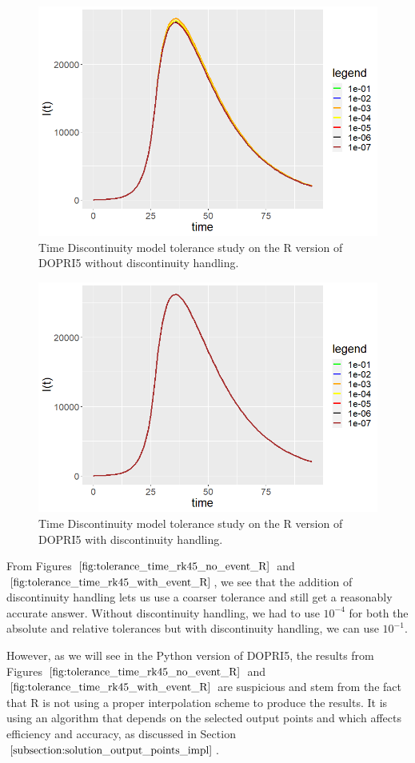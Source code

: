 \begin{figure}[H]
\centering
\includegraphics[width=0.7\linewidth]{./figures/tolerance_time_rk45_no_event_R}
\caption{Time Discontinuity model tolerance study on the R version of DOPRI5 without discontinuity handling.}
\label{fig:tolerance_time_rk45_no_event_R}
\end{figure}

\begin{figure}[H]
\centering
\includegraphics[width=0.7\linewidth]{./figures/tolerance_time_rk45_with_event_R}
\caption{Time Discontinuity model tolerance study on the R version of DOPRI5 with discontinuity handling.}
\label{fig:tolerance_time_rk45_with_event_R}
\end{figure}

From Figures $\ref{fig:tolerance_time_rk45_no_event_R}$ and $\ref{fig:tolerance_time_rk45_with_event_R}$, we see that the addition of discontinuity handling lets us use a coarser tolerance and still get a reasonably accurate answer. Without discontinuity handling, we had to use $10^{-4}$ for both the absolute and relative tolerances but with discontinuity handling, we can use $10^{-1}$. 

However, as we will see in the Python version of DOPRI5, the results from Figures $\ref{fig:tolerance_time_rk45_no_event_R}$ and $\ref{fig:tolerance_time_rk45_with_event_R}$ are suspicious and stem from the fact that R is not using a proper interpolation scheme to produce the results. It is using an algorithm that depends on the selected output points and which affects efficiency and accuracy, as discussed in Section $\ref{subsection:solution_output_points_impl}$. 


